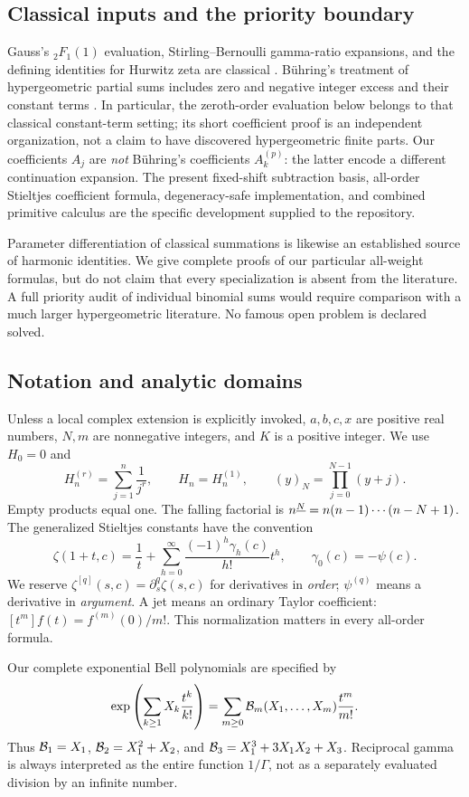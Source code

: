 \subsection{Classical inputs and the priority boundary}
Gauss's ${}_2F_1(1)$ evaluation, Stirling--Bernoulli gamma-ratio expansions,
and the defining identities for Hurwitz zeta are classical
\cite{dlmf-gauss,dlmf-gamma,dlmf-hurwitz}.
B\"uhring's treatment of hypergeometric partial sums includes zero and
negative integer excess and their constant terms \cite{buhring2004}.
In particular, the zeroth-order evaluation below belongs to that classical
constant-term setting; its short coefficient proof is an independent
organization, not a claim to have discovered hypergeometric finite parts.
Our coefficients $A_j$ are \emph{not} B\"uhring's coefficients
$A_k^{(p)}$: the latter encode a different continuation expansion.
The present fixed-shift subtraction basis, all-order Stieltjes coefficient
formula, degeneracy-safe implementation, and combined primitive calculus
are the specific development supplied to the repository.

Parameter differentiation of classical summations is likewise an
established source of harmonic identities.  We give complete proofs of
our particular all-weight formulas, but do not claim that every
specialization is absent from the literature.  A full priority audit of
individual binomial sums would require comparison with a much larger
hypergeometric literature.  No famous open problem is declared solved.

\subsection{Notation and analytic domains}
Unless a local complex extension is explicitly invoked, $a,b,c,x$ are
positive real numbers, $N,m$ are nonnegative integers, and $K$ is a positive
integer.  We use $H_0=0$ and
\[
 H_n^{(r)}=\sum_{j=1}^n\frac1{j^r},\qquad H_n=H_n^{(1)},
 \qquad (y)_N=\prod_{j=0}^{N-1}(y+j).
\]
Empty products equal one.  The falling factorial is
$n^{\underline{N}}=n(n-1)\cdots(n-N+1)$.
The generalized Stieltjes constants have the convention
\begin{equation}\label{eq:stieltjes}
 \zeta(1+t,c)=\frac1t+
 \sum_{h=0}^\infty\frac{(-1)^h\gamma_h(c)}{h!}t^h,
 \qquad \gamma_0(c)=-\psi(c).
\end{equation}
We reserve $\zeta^{[q]}(s,c)=\partial_s^q\zeta(s,c)$ for derivatives in
\emph{order}; $\psi^{(q)}$ means a derivative in \emph{argument}.
A jet means an ordinary Taylor coefficient:
$[t^m]f(t)=f^{(m)}(0)/m!$.
This normalization matters in every all-order formula.

Our complete exponential Bell polynomials are specified by
\begin{equation}\label{eq:bell}
 \exp\left(\sum_{k\ge1}X_k\frac{t^k}{k!}\right)
 =\sum_{m\ge0}\mathcal B_m(X_1,\ldots,X_m)\frac{t^m}{m!}.
\end{equation}
Thus $\mathcal B_1=X_1$, $\mathcal B_2=X_1^2+X_2$, and
$\mathcal B_3=X_1^3+3X_1X_2+X_3$.
Reciprocal gamma is always interpreted as the entire function $1/\Gamma$,
not as a separately evaluated division by an infinite number.
